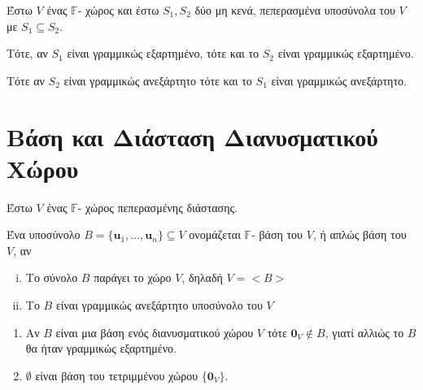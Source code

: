 \documentclass[a4paper,table]{report}
\begin{document}
\begin{thm}
  Έστω $V$ ένας $ \mathbb{F} $- χώρος και έστω $ S_{1}, S_{2} $ δύο μη κενά, 
  πεπερασμένα υποσύνολα του $V$ με $ S_{1} \subseteq S_{2} $. 
  \begin{myitemize}
    \item Τότε, αν $ S_{1} $ είναι γραμμικώς εξαρτημένο, τότε και το $ S_{2} $ 
  είναι γραμμικώς εξαρτημένο.
\item Τότε αν $ S_{2} $ είναι γραμμικώς ανεξάρτητο τότε και το $ S_{1} $ είναι γραμμικώς 
  ανεξάρτητο.
  \end{myitemize}
\end{thm}


\section{Βάση και Διάσταση Διανυσματικού Χώρου}

\begin{dfn}
  Έστω $ V $ ένας $ \mathbb{F} $- χώρος πεπερασμένης διάστασης.

  Ένα υποσύνολο $ B = \{ \mathbf{u}_{1} , \ldots, \mathbf{u}_{n} \} \subseteq V $ 
  ονομάζεται  {\color {Col2} $ \mathbb{F} $- βάση} του $V$, ή απλώς 
  \textcolor{Col2}{βάση} του $V$, αν 
  \begin{enumerate}[i)]
    \item Το σύνολο $B$ παράγει το χώρο $V$, δηλαδή $ V = < B >  $ 
    \item Το $B$ είναι γραμμικώς ανεξάρτητο υποσύνολο του $V$
  \end{enumerate}
\end{dfn}

\begin{rems}
\item {}
  \begin{enumerate}
    \item Αν $B$ είναι μια βάση ενός διανυσματικού χώρου $V$ τότε 
      $ \mathbf{0}_{V} \not \in B $, γιατί αλλιώς το $B$ θα ήταν γραμμικώς 
      εξαρτημένο.
    \item $ \emptyset $ είναι βάση του τετριμμένου χώρου $ \{ \mathbf{0}_{V} \} $.
  \end{enumerate}
\end{rems}
\end{document}
